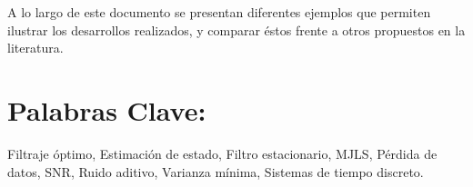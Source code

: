 A lo largo de este documento se presentan diferentes ejemplos que permiten ilustrar los desarrollos realizados, y comparar \'estos frente a otros propuestos en la literatura.

\section*{Palabras Clave:} Filtraje \'optimo, Estimaci\'on de estado, Filtro estacionario, MJLS, P\'erdida de datos, SNR, Ruido aditivo, Varianza m\'inima, Sistemas de tiempo discreto.